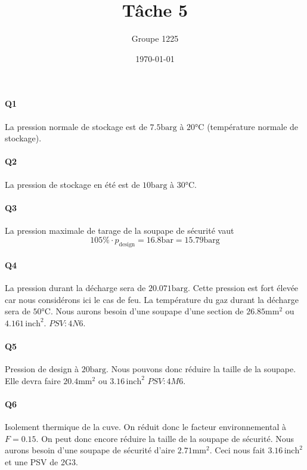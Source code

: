 \documentclass[a4paper,oneside,12pt]{article}
\title{T\^ache 5}
\author{Groupe 1225}
\date{\today}
\newcommand{\barg}{\si{\bar}\text{g}}
\begin{document}
\maketitle

\paragraph{Q1} La pression normale de stockage est de $7.5 \barg$ à $20\si{\celsius}$ 
(température normale de stockage).

\paragraph{Q2} La pression de stockage en été est de $10 \barg$ à $30\si{\celsius}$.

\paragraph{Q3} La pression maximale de tarage de la soupape de sécurité vaut 
\[ 105\% \cdot p_{\text{design}} = 16.8\si{\bar} = 15.79\barg \]

\paragraph{Q4} 
La pression durant la décharge sera de $20.071 \barg$. 
Cette pression est fort élevée car nous considérons ici le cas de feu. 
La température du gaz durant la décharge sera de $50\si{\celsius}$. 
Nous aurons besoin d'une soupape d'une section de $26.85\si{\milli\meter\squared}$ 
ou $4.161 \, \text{inch}^2$. $PSV : 4N6$.

\paragraph{Q5} 
Pression de design à $20\barg$. Nous pouvons donc réduire la taille de la soupape. 
Elle devra faire $20.4\si{\milli\meter\squared}$ ou $3.16 \, \text{inch}^2$ $PSV : 4M6$.

\paragraph{Q6}
Isolement thermique de la cuve. 
On réduit donc le facteur environnemental à $F = 0.15$. 
On peut donc encore réduire la taille de la soupape de sécurité. 
Nous aurons besoin d'une soupape de sécurité d'aire $2.71\si{\milli\meter\squared}$. 
Ceci nous fait $3.16 \, \text{inch}^2$ et une PSV de 2G3.
\end{document}
